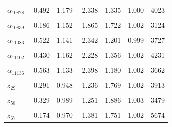 \begin{longtable}{lrrrrrr}
$\alpha_{10828}$ & -0.492 & 1.179 & -2.338 & 1.335 & 1.000 & 4023\\
\cellcolor{gray!10}{$\alpha_{10838}$} & \cellcolor{gray!10}{-0.416} & \cellcolor{gray!10}{1.164} & \cellcolor{gray!10}{-2.183} & \cellcolor{gray!10}{1.378} & \cellcolor{gray!10}{1.001} & \cellcolor{gray!10}{4764}\\
$\alpha_{10839}$ & -0.186 & 1.152 & -1.865 & 1.722 & 1.002 & 3124\\
\cellcolor{gray!10}{$\alpha_{10891}$} & \cellcolor{gray!10}{-0.566} & \cellcolor{gray!10}{1.166} & \cellcolor{gray!10}{-2.458} & \cellcolor{gray!10}{1.139} & \cellcolor{gray!10}{1.000} & \cellcolor{gray!10}{3682}\\
$\alpha_{11083}$ & -0.522 & 1.141 & -2.342 & 1.201 & 0.999 & 3727\\
\cellcolor{gray!10}{$\alpha_{11087}$} & \cellcolor{gray!10}{-0.380} & \cellcolor{gray!10}{1.174} & \cellcolor{gray!10}{-2.162} & \cellcolor{gray!10}{1.391} & \cellcolor{gray!10}{1.000} & \cellcolor{gray!10}{4638}\\
$\alpha_{11102}$ & -0.430 & 1.162 & -2.228 & 1.356 & 1.002 & 4231\\
\cellcolor{gray!10}{$\alpha_{11124}$} & \cellcolor{gray!10}{-0.424} & \cellcolor{gray!10}{1.140} & \cellcolor{gray!10}{-2.178} & \cellcolor{gray!10}{1.310} & \cellcolor{gray!10}{1.000} & \cellcolor{gray!10}{4489}\\
$\alpha_{11136}$ & -0.563 & 1.133 & -2.398 & 1.180 & 1.002 & 3662\\
\cellcolor{gray!10}{$\alpha_{11147}$} & \cellcolor{gray!10}{-0.395} & \cellcolor{gray!10}{1.160} & \cellcolor{gray!10}{-2.202} & \cellcolor{gray!10}{1.410} & \cellcolor{gray!10}{1.002} & \cellcolor{gray!10}{4758}\\
$z_{29}$ & 0.291 & 0.948 & -1.236 & 1.769 & 1.002 & 3913\\
\cellcolor{gray!10}{$z_{35}$} & \cellcolor{gray!10}{0.070} & \cellcolor{gray!10}{0.953} & \cellcolor{gray!10}{-1.471} & \cellcolor{gray!10}{1.632} & \cellcolor{gray!10}{1.003} & \cellcolor{gray!10}{6886}\\
$z_{58}$ & 0.329 & 0.989 & -1.251 & 1.886 & 1.003 & 3479\\
\cellcolor{gray!10}{$z_{59}$} & \cellcolor{gray!10}{0.114} & \cellcolor{gray!10}{0.949} & \cellcolor{gray!10}{-1.390} & \cellcolor{gray!10}{1.602} & \cellcolor{gray!10}{1.002} & \cellcolor{gray!10}{6636}\\
$z_{67}$ & 0.174 & 0.970 & -1.381 & 1.751 & 1.002 & 5674\\

\end{longtable}
